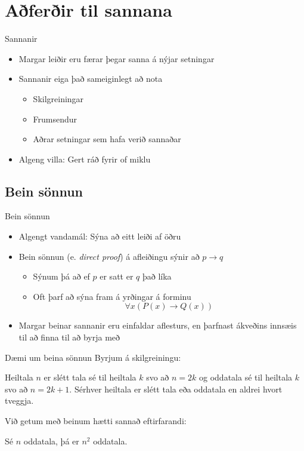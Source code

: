 \documentclass{beamer}
\begin{document}
\section{Aðferðir til sannana}

\begin{frame}{Sannanir}
    \begin{itemize}
        \item Margar leiðir eru færar þegar sanna á nýjar setningar
        \item Sannanir eiga það sameiginlegt að nota
        \begin{itemize}
            \item Skilgreiningar
            \item Frumsendur
            \item Aðrar setningar sem hafa verið sannaðar
        \end{itemize}
        \item Algeng villa: Gert ráð fyrir of miklu
    \end{itemize}
\end{frame}

\subsection{Bein sönnun}

\begin{frame}{Bein sönnun}
    \begin{itemize}
        \item Algengt vandamál: Sýna að eitt leiði af öðru
        \item Bein sönnun (e. \emph{direct proof}) á afleiðingu sýnir að $p \to q$
        \begin{itemize}
            \item Sýnum þá að ef $p$ er satt er $q$ það líka
            \item Oft þarf að sýna fram á yrðingar á forminu \[\forall x (P(x) \to Q(x))\]
        \end{itemize}
        \item Margar beinar sannanir eru einfaldar aflesturs, en þarfnast ákveðins innsæis til að finna til að byrja með
    \end{itemize}
\end{frame}

\begin{frame}{Dæmi um beina sönnun}
    Byrjum á skilgreiningu:
    \begin{tcolorbox}[title=Oddatölur og sléttar tölur]
        Heiltala $n$ er slétt tala sé til heiltala $k$ svo að $n = 2k$ og oddatala sé til heiltala $k$ svo að $n = 2k+1$. Sérhver heiltala er slétt tala eða oddatala en aldrei hvort tveggja.
    \end{tcolorbox}
    Við getum með beinum hætti sannað eftirfarandi:
    \begin{tcolorbox}
        Sé $n$ oddatala, þá er $n^2$ oddatala.
    \end{tcolorbox}
\end{frame}
\end{document}
